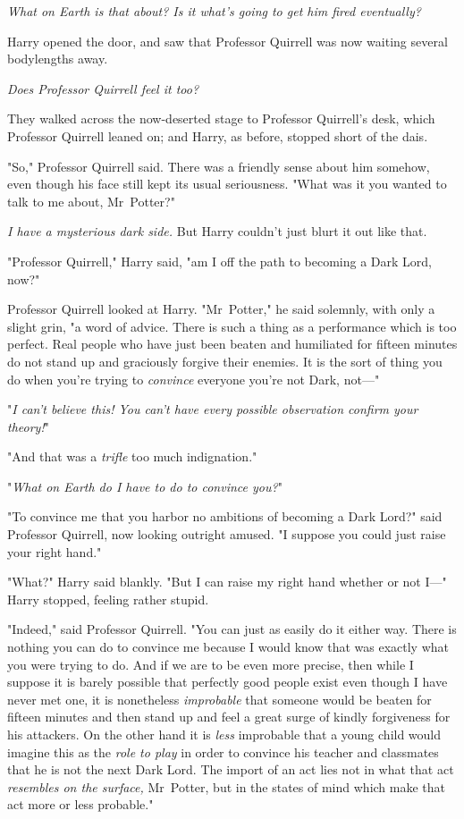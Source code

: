 \emph{What on Earth is that about? Is it what's going to get him fired
eventually?}

Harry opened the door, and saw that Professor Quirrell was now waiting several
bodylengths away.

\emph{Does Professor Quirrell feel it too?}

They walked across the now-deserted stage to Professor Quirrell's desk, which
Professor Quirrell leaned on; and Harry, as before, stopped short of the dais.

"So," Professor Quirrell said. There was a friendly sense about him somehow,
even though his face still kept its usual seriousness. "What was it you wanted
to talk to me about, Mr~Potter?"

\emph{I have a mysterious dark side.} But Harry couldn't just blurt it out like
that.

"Professor Quirrell," Harry said, "am I off the path to becoming a Dark Lord,
now?"

Professor Quirrell looked at Harry. "Mr~Potter," he said solemnly, with only a
slight grin, "a word of advice. There is such a thing as a performance which is
too perfect. Real people who have just been beaten and humiliated for fifteen
minutes do not stand up and graciously forgive their enemies. It is the sort of
thing you do when you're trying to \emph{convince} everyone you're not Dark,
not---"

"\emph{I can't believe this! You can't have every possible observation confirm
your theory!}"

"And that was a \emph{trifle} too much indignation."

"\emph{What on Earth do I have to do to convince you?}"

"To convince me that you harbor no ambitions of becoming a Dark Lord?" said
Professor Quirrell, now looking outright amused. "I suppose you could just
raise your right hand."

"What?" Harry said blankly. "But I can raise my right hand whether or not I---"
Harry stopped, feeling rather stupid.

"Indeed," said Professor Quirrell. "You can just as easily do it either way.
There is nothing you can do to convince me because I would know that was
exactly what you were trying to do. And if we are to be even more precise, then
while I suppose it is barely possible that perfectly good people exist even
though I have never met one, it is nonetheless \emph{improbable} that someone
would be beaten for fifteen minutes and then stand up and feel a great surge of
kindly forgiveness for his attackers. On the other hand it is \emph{less}
improbable that a young child would imagine this as the \emph{role to play} in
order to convince his teacher and classmates that he is not the next Dark Lord.
The import of an act lies not in what that act \emph{resembles on the surface,}
Mr~Potter, but in the states of mind which make that act more or less
probable."


